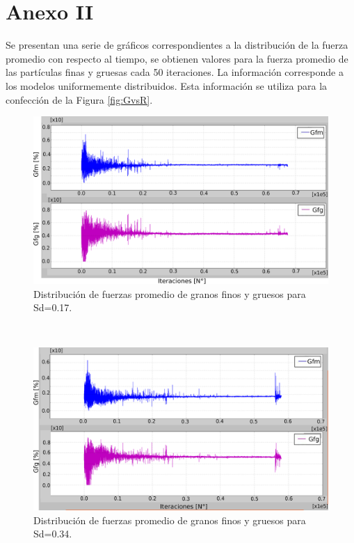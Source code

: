 \renewcommand{\appendixtocname}{Anexo II}
 \addappheadtotoc %
\chapter*{ Anexo II} 

Se presentan una serie de gr\'aficos correspondientes a la distribuci\'on de la fuerza promedio con respecto al tiempo, se obtienen valores para la fuerza promedio de las part\'iculas finas y gruesas cada 50 iteraciones. La informaci\'on corresponde a los modelos uniformemente distribuidos. Esta informaci\'on se utiliza para la confecci\'on de la Figura \ref{fig:GvsR}. \\ 

\begin{figure}[H]
\centering
\includegraphics[width=\textwidth]{Anexo1/PSD17}
\caption{Distribuci\'on de fuerzas promedio de granos finos y gruesos para Sd=0.17.}
\label{fig:PSD17}
\end{figure}\\


\begin{figure}[H]
\centering
\includegraphics[width=\textwidth]{Anexo1/PSD34}
\caption{Distribuci\'on de fuerzas promedio de granos finos y gruesos para Sd=0.34.}
\label{fig:PSD34}
\end{figure}\\


